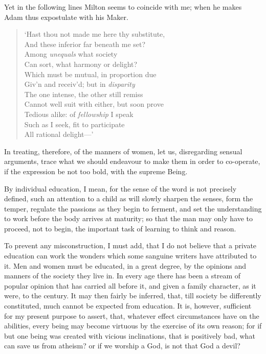 Yet in the following lines Milton seems to coincide with me; when he
makes Adam thus expostulate with his Maker.

\begin{verse}
`Hast thou not made me here thy substitute,\\
And these inferior far beneath me set?\\
Among \textit{unequals} what society\\
Can sort, what harmony or delight?\\
Which must be mutual, in proportion due\\
Giv'n and receiv'd; but in \textit{disparity}\\
The one intense, the other still remiss\\
Cannot well suit with either, but soon prove\\
Tedious alike: of \textit{fellowship} I speak\\
Such as I seek, fit to participate\\
All rational delight---'
\end{verse}

In treating, therefore, of the manners of women, let us, disregarding
sensual arguments, trace what we should endeavour to make them in
order to co-operate, if the expression be not too bold, with the
supreme Being.

By individual education, I mean, for the sense of the word is not
precisely defined, such an attention to a child as will slowly sharpen
the senses, form the temper, regulate the passions as they begin to
ferment, and set the understanding to work before the body arrives at
maturity; so that the man may only have to proceed, not to begin, the
important task of learning to think and reason.

To prevent any misconstruction, I must add, that I do not believe that
a private education can work the wonders which some sanguine writers
have attributed to it. Men and women must be educated, in a great
degree, by the opinions and manners of the  society they live
in. In every age there has been a stream of popular opinion that has
carried all before it, and given a family character, as it were, to
the century. It may then fairly be inferred, that, till society be
differently constituted, much cannot be expected from education. It
is, however, sufficient for my present purpose to assert, that,
whatever effect circumstances have on the abilities, every being may
become virtuous by the exercise of its own reason; for if but one
being was created with vicious inclinations, that is positively bad,
what can save us from atheism? or if we worship a God, is not that God
a devil?

